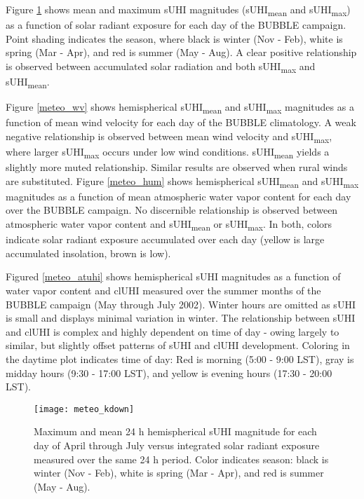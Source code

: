 \begin{bibunit}
Figure \ref{meteo_sol} shows mean and maximum sUHI magnitudes (sUHI\textsubscript{mean} and sUHI\textsubscript{max}) as a function of solar radiant exposure for each day of the BUBBLE campaign. Point shading indicates the season, where black is winter (Nov - Feb), white is spring (Mar - Apr), and red is summer (May - Aug). A clear positive relationship is observed between accumulated solar radiation and both sUHI\textsubscript{max} and sUHI\textsubscript{mean}. 

Figure \ref{meteo_wv} shows hemispherical sUHI\textsubscript{mean} and sUHI\textsubscript{max} magnitudes as a function of mean wind velocity for each day of the BUBBLE climatology. A weak negative relationship is observed between mean wind velocity and sUHI\textsubscript{max}, where larger sUHI\textsubscript{max} occurs under low wind conditions. sUHI\textsubscript{mean} yields a slightly more muted relationship. Similar results are observed when rural winds are substituted. Figure \ref{meteo_hum} shows hemispherical sUHI\textsubscript{mean} and sUHI\textsubscript{max} magnitudes as a function of mean atmospheric water vapor content for each day over the BUBBLE campaign. No discernible relationship is observed between atmospheric water vapor content and sUHI\textsubscript{mean} or sUHI\textsubscript{max}.  In both, colors indicate solar radiant exposure accumulated over each day (yellow is large accumulated insolation, brown is low).

Figured \ref{meteo_atuhi} shows hemispherical sUHI magnitudes as a function of water vapor content and clUHI measured over the summer months of the BUBBLE campaign (May through July 2002). Winter hours are omitted as sUHI is small and displays minimal variation in winter. The relationship between sUHI and clUHI is complex and highly dependent on time of day - owing largely to similar, but slightly offset patterns of sUHI and clUHI development. Coloring in the daytime plot indicates time of day: Red is morning (5:00 - 9:00 LST), gray is midday hours (9:30 - 17:00 LST), and yellow is evening hours (17:30 - 20:00 LST).

\pagebreak

\begin{figure}[H]
	\centering
	\texttt{[image: meteo\_kdown]}
	\caption{Maximum and mean 24 \si{\hour} hemispherical sUHI magnitude for each day of April through July versus integrated solar radiant exposure measured over the same 24 \si{\hour} period. Color indicates season: black is winter (Nov - Feb), white is spring (Mar - Apr), and red is summer (May - Aug). }
	\label{meteo_sol}
\end{figure}


\end{bibunit}
